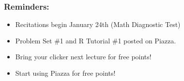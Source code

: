 \documentclass{beamer}
\begin{document}

\begin{frame}
\frametitle{Reminders:}
\begin{itemize}
	\item Recitations begin January 24th (Math Diagnostic Test)
	\item Problem Set \#1 and R Tutorial \#1 posted on Piazza.
	\item Bring your clicker next lecture for free points!
	\item Start using Piazza for free points!
\end{itemize}
\end{frame}
\end{document}
